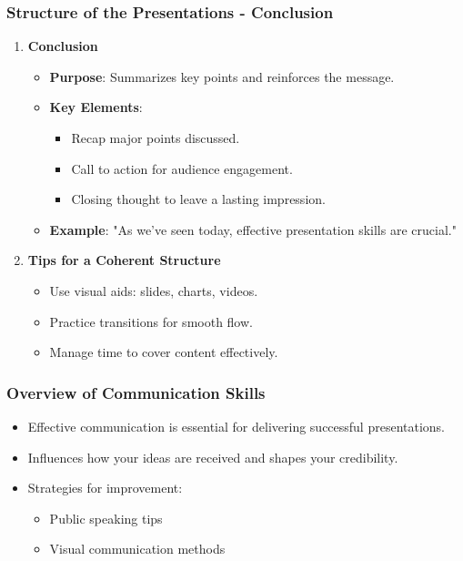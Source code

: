 \documentclass[aspectratio=169]{beamer}
\begin{document}
\begin{frame}[fragile]
    \frametitle{Structure of the Presentations - Conclusion}
    \begin{enumerate}
        \item \textbf{Conclusion}
        \begin{itemize}
            \item \textbf{Purpose}: Summarizes key points and reinforces the message.
            \item \textbf{Key Elements}:
            \begin{itemize}
                \item Recap major points discussed.
                \item Call to action for audience engagement.
                \item Closing thought to leave a lasting impression.
            \end{itemize}
            \item \textbf{Example}: "As we’ve seen today, effective presentation skills are crucial."
        \end{itemize}

        \item \textbf{Tips for a Coherent Structure}
        \begin{itemize}
            \item Use visual aids: slides, charts, videos.
            \item Practice transitions for smooth flow.
            \item Manage time to cover content effectively.
        \end{itemize}
    \end{enumerate}
\end{frame}

\begin{frame}[fragile]
    \frametitle{Overview of Communication Skills}
    \begin{itemize}
        \item Effective communication is essential for delivering successful presentations.
        \item Influences how your ideas are received and shapes your credibility.
        \item Strategies for improvement:
            \begin{itemize}
                \item Public speaking tips
                \item Visual communication methods
            \end{itemize}
    \end{itemize}
\end{frame}
\end{document}
